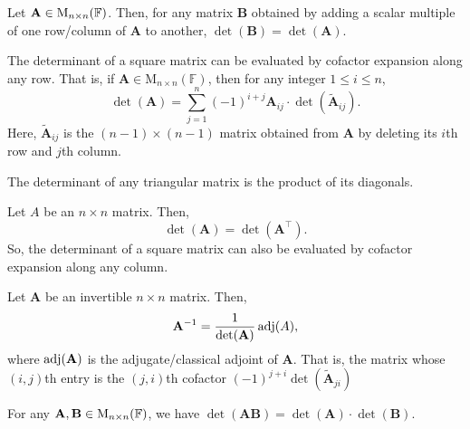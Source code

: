 \documentclass[../Notes.tex]{subfiles}
\begin{document}
\begin{corollary}{}{}
    Let \(\mathbf{A}\in\operatorname{M}_{n \times n}(\mathbb{F})\). Then, for any matrix \(\mathbf{B}\) obtained by adding a scalar multiple of one row/column of \(\mathbf{A}\) to another, \(\det(\mathbf{B})=\det(\mathbf{A})\).
\end{corollary}
\begin{theorem}{}{}
    The determinant of a square matrix can be evaluated by cofactor expansion along any row. That is, if \(\mathbf{A} \in \mathrm{M}_{n\times n}(\mathbb{F})\), then for any integer \(1\leq i\leq n\),
        \[\det(\mathbf{A})=\sum_{j=1}^{n}{(-1)}^{i+j}\mathbf{A}_{ij}\cdot \det(\widetilde{\mathbf{A}}_{ij}).\] 
        Here, \(\widetilde{\mathbf{A}}_{ij}\) is the \((n-1)\times(n-1)\) matrix obtained from \(\mathbf{A}\) by deleting its \(i\)th row and \(j\)th column.
\end{theorem}
\begin{corollary}{}{}
    The determinant of any triangular matrix is the product of its diagonals.
\end{corollary}
\begin{theorem}{}{}
    Let \(A\) be an \(n\times n\) matrix. Then,
    \[\det(\mathbf{A})=\det(\mathbf{A}^\top).\]
    So, the determinant of a square matrix can also be evaluated by cofactor expansion along any column.
\end{theorem}
\begin{theorem}{}{}
    Let \(\mathbf{A}\) be an invertible \(n\times n\) matrix. Then,
    \[\mathbf{A}^{-1}=\frac{1}{\det(\mathbf{A})}\operatorname{adj}(A),\]
    where \(\operatorname{adj}(\mathbf{A})\) is the adjugate/classical adjoint of \(\mathbf{A}\). That is, the matrix whose \((i,j)\)th entry is the \((j,i)\)th cofactor \((-1)^{j+i}\det(\widetilde{\mathbf{A}}_{ji})\)
\end{theorem}
\begin{theorem}{}{}
    For any \(\mathbf{A},\mathbf{B} \in\operatorname{M}_{n \times n}(\mathbb{F})\), we have \(\det(\mathbf{A}\mathbf{B})=\det(\mathbf{A})\cdot\det(\mathbf{B})\).
\end{theorem}
\end{document}
